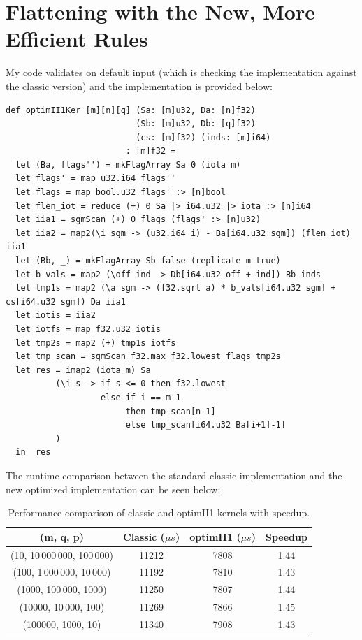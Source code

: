 \section{Flattening with the New, More Efficient Rules}
My code validates on default input (which is checking the implementation
against the classic version) and the implementation is provided below:
\begin{lstlisting}[language={futhark}]
def optimII1Ker [m][n][q] (Sa: [m]u32, Da: [n]f32)
                          (Sb: [m]u32, Db: [q]f32)
                          (cs: [m]f32) (inds: [m]i64)
                        : [m]f32 =
  let (Ba, flags'') = mkFlagArray Sa 0 (iota m) 
  let flags' = map u32.i64 flags''
  let flags = map bool.u32 flags' :> [n]bool
  let flen_iot = reduce (+) 0 Sa |> i64.u32 |> iota :> [n]i64
  let iia1 = sgmScan (+) 0 flags (flags' :> [n]u32)
  let iia2 = map2(\i sgm -> (u32.i64 i) - Ba[i64.u32 sgm]) (flen_iot) iia1 
  let (Bb, _) = mkFlagArray Sb false (replicate m true)
  let b_vals = map2 (\off ind -> Db[i64.u32 off + ind]) Bb inds
  let tmp1s = map2 (\a sgm -> (f32.sqrt a) * b_vals[i64.u32 sgm] + cs[i64.u32 sgm]) Da iia1 
  let iotis = iia2 
  let iotfs = map f32.u32 iotis
  let tmp2s = map2 (+) tmp1s iotfs
  let tmp_scan = sgmScan f32.max f32.lowest flags tmp2s
  let res = imap2 (iota m) Sa 
          (\i s -> if s <= 0 then f32.lowest 
                   else if i == m-1
                        then tmp_scan[n-1]
                        else tmp_scan[i64.u32 Ba[i+1]-1]
          ) 
  in  res
\end{lstlisting}

The runtime comparison between the standard classic implementation and the new
optimized implementation can be seen below:
\begin{table}[ht]
\centering
\begin{tabular}{c|c|c|c}
\hline
\textbf{(m, q, p)} & \textbf{Classic ($\mu s$)} & \textbf{optimII1 ($\mu s$)} & \textbf{Speedup} \\
\hline
(10, 10\,000\,000, 100\,000)     & 11212 & 7808 & 1.44 \\
(100, 1\,000\,000, 10\,000)      & 11192 & 7810 & 1.43 \\
(1000, 100\,000, 1000)           & 11250 & 7807 & 1.44 \\
(10000, 10\,000, 100)            & 11269 & 7866 & 1.45 \\
(100000, 1000, 10)               & 11340 & 7908 & 1.43 \\
\hline
\end{tabular}
\caption{Performance comparison of classic and optimII1 kernels with speedup.}
\end{table}

